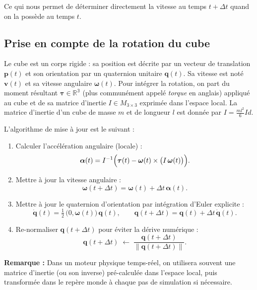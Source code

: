 \documentclass[a4paper,12pt]{article}
\begin{document}
Ce qui nous permet de déterminer directement la vitesse au temps $t+\Delta t$ quand on la possède au temps $t$.

\subsection*{Prise en compte de la rotation du cube}

Le cube est un corps rigide : sa position est décrite par un vecteur de translation $\mathbf{p}(t)$ et son orientation par un quaternion unitaire $\mathbf{q}(t)$. Sa vitesse est noté $\mathbf{v}(t)$ et sa vitesse angulaire $\mathbf{\omega}(t)$.   
Pour intégrer la rotation, on part du moment résultant $\boldsymbol{\tau}\in\mathbb{R^3}$ (plus communément appelé \emph{torque} en anglais) appliqué au cube et de sa matrice d'inertie $I\in M_{3\times3}$ exprimée dans l'espace local. La matrice d'inertie d'un cube de masse $m$ et de longueur $l$ est donnée par $I = \frac{ml^2}{6}Id$.

L'algorithme de mise à jour est le suivant :

\begin{enumerate}
  \item Calculer l'accélération angulaire (locale) :
        \[
            \boldsymbol{\alpha}(t)
            = I^{-1}
              \Bigl(\boldsymbol{\tau}(t)
              - \boldsymbol{\omega}(t)\times \bigl(I\,\boldsymbol{\omega}(t)\bigr)\Bigr).
        \]
  \item Mettre à jour la vitesse angulaire :
        \[
            \boldsymbol{\omega}(t+\Delta t)
            = \boldsymbol{\omega}(t) + \Delta t\,\boldsymbol{\alpha}(t).
        \]
  \item Mettre à jour le quaternion d'orientation par intégration d'Euler explicite :
        \[
            \dot{\mathbf{q}}(t)
            = \tfrac12\,
              \bigl(0,\boldsymbol{\omega}(t)\bigr)\,\mathbf{q}(t),\qquad
            \mathbf{q}(t+\Delta t)
            = \mathbf{q}(t) + \Delta t\,\dot{\mathbf{q}}(t).
        \]
  \item Re-normaliser $\mathbf{q}(t+\Delta t)$ pour éviter la dérive numérique :
        \[
            \mathbf{q}(t+\Delta t) \;\leftarrow\;
            \frac{\mathbf{q}(t+\Delta t)}{\lVert\mathbf{q}(t+\Delta t)\rVert}.
        \]
\end{enumerate}

\textbf{Remarque :} Dans un moteur physique temps-réel, on utilisera souvent une matrice d'inertie (ou son inverse) pré-calculée dans l'espace local, puis transformée dans le repère monde à chaque pas de simulation si nécessaire.
\end{document}
